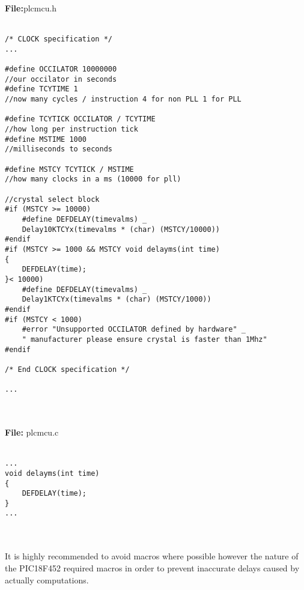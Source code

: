 \textbf{File:}plcmcu.h
\\
\\
\begin{minipage}{\textwidth}
\begin{lstlisting}[frame=single]
/* CLOCK specification */
...

#define OCCILATOR 10000000 
//our occilator in seconds
#define TCYTIME 1 
//now many cycles / instruction 4 for non PLL 1 for PLL 

#define TCYTICK OCCILATOR / TCYTIME 
//how long per instruction tick
#define MSTIME 1000 
//milliseconds to seconds

#define MSTCY TCYTICK / MSTIME 
//how many clocks in a ms (10000 for pll)

//crystal select block
#if (MSTCY >= 10000)
	#define DEFDELAY(timevalms) _
	Delay10KTCYx(timevalms * (char) (MSTCY/10000))
#endif
#if (MSTCY >= 1000 && MSTCY void delayms(int time)
{
	DEFDELAY(time);
}< 10000)
	#define DEFDELAY(timevalms) _ 
	Delay1KTCYx(timevalms * (char) (MSTCY/1000))
#endif
#if (MSTCY < 1000)
	#error "Unsupported OCCILATOR defined by hardware" _ 
	" manufacturer please ensure crystal is faster than 1Mhz"
#endif

/* End CLOCK specification */

...
\end{lstlisting}
\end{minipage}
\\
\\
\textbf{File:} plcmcu.c
\\
\\
\begin{minipage}{\textwidth}
\begin{lstlisting}[frame=single]
...
void delayms(int time)
{
	DEFDELAY(time);
}
...
\end{lstlisting}
\end{minipage}
\\
\\
It is highly recommended to avoid macros where possible however the nature of the PIC18F452 required macros in order to prevent inaccurate delays caused by actually computations.